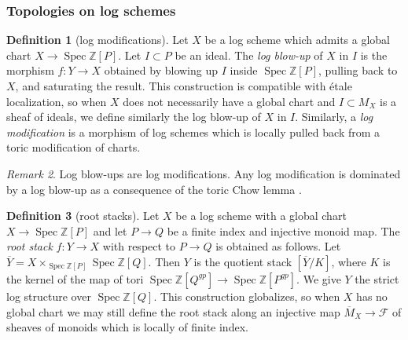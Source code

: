 \documentclass[a4paper,11pt]{amsart} %
\numberwithin{equation}{subsection}
\newcommand{\bb}[1]{{\mathbb{#1}}}
\newcommand{\ca}[1]{{\mathcal{#1}}}
\newcommand{\ul}[1]{{\underline{#1}}}
\def\o#1{\overline{#1}}
\newcommand{\Spec}{\operatorname{Spec}}
\theoremstyle{definition}
\newtheorem{definition}{Definition}[section]
\theoremstyle{plain}%
\theoremstyle{remark}
\newtheorem{remark}[definition]{Remark}
\newcommand{\Tcomment}[1]{{\color{red}T: #1}}
\newcommand{\Scomment}[1]{{\color{blue}S: #1}}
\begin{document}
\subsubsection{Topologies on log schemes}




\begin{definition}[log modifications]
    Let $X$ be a log scheme which admits a global chart $X \to \Spec \bb Z[P]$. Let $I\subset P$ be an ideal. The \emph{log blow-up} of $X$ in $I$ is the morphism $f \colon Y \to X$ obtained by blowing up $I$ inside $\Spec \bb Z[P]$, pulling back to $X$, and saturating the result. This construction is compatible with \'etale localization, so when $X$ does not necessarily have a global chart and $I\subset M_X$ is a sheaf of ideals, we define similarly the log blow-up of $X$ in $I$. Similarly, a \emph{log modification} is a morphism of log schemes which is locally pulled back from a toric modification of charts.
\end{definition}

\begin{remark}
    Log blow-ups are log modifications. Any log modification is dominated by a log blow-up as a consequence of the toric Chow lemma \cite[Lemma 6.9.2.]{Danilov1978GeometryToricVar}.
\end{remark}

\begin{definition}[root stacks]
    Let $X$ be a log scheme with a global chart $X \to \Spec \bb Z[P]$ and let $P \to Q$ be a finite index and injective monoid map. The \emph{root stack} $f \colon Y \to X$ with respect to $P \to Q$ is obtained as follows. Let $\overline Y=X \times_{\Spec \bb Z[P]} \Spec \bb Z[Q]$. Then $Y$ is the quotient stack $[\overline Y/K]$, where $K$ is the kernel of the map of tori $\Spec \bb Z[Q^{gp}] \to \Spec \bb Z[P^{gp}]$. We give $Y$ the strict log structure over $\Spec \bb Z[Q]$. This construction globalizes, so when $X$ has no global chart we may still define the root stack along an injective map $\o{M}_X \to \ca F$ of sheaves of monoids which is locally of finite index. 
\end{definition}
\end{document}
